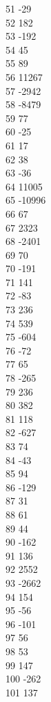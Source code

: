 { 51	-29 \\
 52	182 \\
 53	-192 \\
 54	45 \\
 55	89 \\
 56	11267 \\
 57	-2942 \\
 58	-8479 \\
 59	77 \\
 60	-25 \\
 61	17 \\
 62	38 \\
 63	-36 \\
 64	11005 \\
 65	-10996 \\
 66	67 \\
 67	2323 \\
 68	-2401 \\
 69	70 \\
 70	-191 \\
 71	141 \\
 72	-83 \\
 73	236 \\
 74	539 \\
 75	-604 \\
 76	-72 \\
 77	65 \\
 78	-265 \\
 79	236 \\
 80	382 \\
 81	118 \\
 82	-627 \\
 83	74 \\
 84	-43 \\
 85	94 \\
 86	-129 \\
 87	31 \\
 88	61 \\
 89	44 \\
 90	-162 \\
 91	136 \\
 92	2552 \\
 93	-2662 \\
 94	154 \\
 95	-56 \\
 96	-101 \\
 97	56 \\
 98	53 \\
 99	147 \\
 100	-262 \\
 101	137 \\
}
